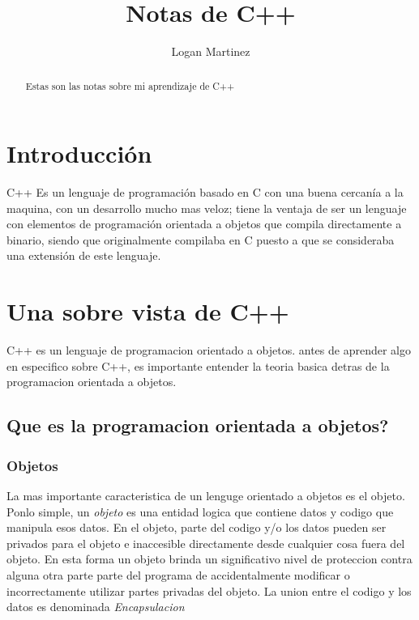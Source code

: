 \documentclass[]{article}
\title{Notas de C++}
\author{Logan Martinez}
\begin{document}
	
	\maketitle
	
	\begin{abstract}
		Estas son las notas sobre mi aprendizaje de C++
	\end{abstract}

	\section{Introducción}
	C++ Es un lenguaje de programación basado en C con una buena cercanía a la maquina, con un desarrollo mucho mas veloz; tiene la ventaja de ser un lenguaje con elementos de programación orientada a objetos que compila directamente a binario, siendo que originalmente compilaba en C puesto a que se consideraba una extensión de este lenguaje.
	
	\section{Una sobre vista de C++}
	
	C++ es un lenguaje de programacion orientado a objetos. antes de aprender algo en especifico sobre C++, es importante entender la teoria basica detras de la programacion orientada a objetos.
	
		\subsection{Que es la programacion orientada a objetos?}
		
			\subsubsection{Objetos}
		
			La mas importante caracteristica de un lenguge orientado a objetos es el objeto. Ponlo simple, un \textit{objeto} es una entidad logica que contiene datos y codigo que manipula esos datos. En el objeto, parte del codigo y/o los datos pueden ser privados para el objeto e inaccesible directamente desde cualquier cosa fuera del objeto. En esta forma un objeto brinda un significativo nivel de proteccion contra alguna otra parte parte del programa de accidentalmente modificar o incorrectamente utilizar partes privadas del objeto. La union entre el codigo y los datos es denominada \textit{Encapsulacion}
		
\end{document}

